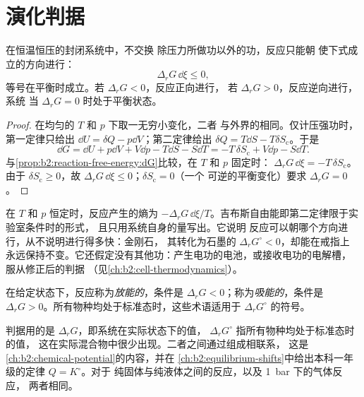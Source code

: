 \section{演化判据}

\begin{theorem}[演化判据]\label{thm:b2:reaction-free-energy:evolution}
在恒温恒压的封闭系统中，不交换
除压力所做功以外的功，反应只能朝
使下式成立的方向进行：
\[
  \Delta_r G\,\dd\xi \leq 0 ,
\]
等号在平衡时成立。若 $\Delta_r G < 0$，反应正向进行，
若 $\Delta_r G > 0$，反应逆向进行，系统
当 $\Delta_r G = 0$ 时处于平衡状态。
\end{theorem}

\begin{proof}
在均匀的 $T$ 和 $p$ 下取一无穷小变化，二者
与外界的相同。仅计压强功时，第一定律只给出 $\dd U = \delta Q
- p\dd V$；第二定律给出 $\delta Q = T\dd S - T\delta S_{\text{c}}$。于是
\[
  \dd G = \dd U + p\dd V + V\dd p - T\dd S - S\dd T = -T\,\delta
  S_{\text{c}} + V\dd p - S\dd T .
\]
与\cref{prop:b2:reaction-free-energy:dG}比较，在 $T$ 和 $p$ 固定时：
$\Delta_r G\,\dd\xi = -T\,\delta S_{\text{c}}$。由于 $\delta S_{\text{c}}
\geq 0$，故 $\Delta_r G\,\dd\xi \leq 0$；$\delta S_{\text{c}} = 0$（一个
可逆的平衡变化）要求 $\Delta_r G = 0$。
\end{proof}

\begin{remark}\label{rem:b2:reaction-free-energy:criterion}
在 $T$ 和 $p$ 恒定时，反应产生的熵为 $-\Delta_r G\,
\dd\xi/T$。吉布斯自由能即第二定律限于实验室条件时的形式，
且只用系统自身的量写出。它说明
反应可以朝哪个方向进行，从不说明进行得多快：金刚石，
其转化为石墨的 $\Delta_r G^\circ < 0$，却能在戒指上
永远保持不变。它还假定没有其他功：产生电功的电池，或接收电功的电解槽，
服从修正后的判据
（见\cref{ch:b2:cell-thermodynamics}）。
\end{remark}

\begin{definition}[放能与吸能]\label{def:b2:reaction-free-energy:exergonic}
在给定状态下，反应称为\emph{放能的}，条件是
$\Delta_r G < 0$；称为\emph{吸能的}，条件是 $\Delta_r G >
0$。所有物种均处于标准态时，这些术语适用于
$\Delta_r G^\circ$ 的符号。
\end{definition}

判据用的是 $\Delta_r G$，即系统在实际状态下的值，
$\Delta_r G^\circ$ 指所有物种均处于标准态时的值，
这在实际混合物中很少出现。二者之间通过组成相联系，
这是\cref{ch:b2:chemical-potential}的内容，并在
\cref{ch:b2:equilibrium-shifts}中给出本科一年级的定律 $Q = K^\circ$。对于
纯固体与纯液体之间的反应，以及 \qty{1}{bar} 下的气体反应，
两者相同。

